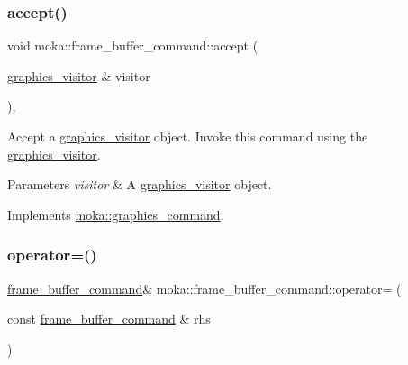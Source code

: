 \subsubsection{\texorpdfstring{accept()}{accept()}}
{\footnotesize\ttfamily void moka\+::frame\+\_\+buffer\+\_\+command\+::accept (\begin{DoxyParamCaption}\item[{\mbox{\hyperlink{classmoka_1_1graphics__visitor}{graphics\+\_\+visitor}} \&}]{visitor }\end{DoxyParamCaption})\hspace{0.3cm}{\ttfamily [override]}, {\ttfamily [virtual]}}



Accept a \mbox{\hyperlink{classmoka_1_1graphics__visitor}{graphics\+\_\+visitor}} object. Invoke this command using the \mbox{\hyperlink{classmoka_1_1graphics__visitor}{graphics\+\_\+visitor}}. 


\begin{DoxyParams}{Parameters}
{\em visitor} & A \mbox{\hyperlink{classmoka_1_1graphics__visitor}{graphics\+\_\+visitor}} object. \\
\hline
\end{DoxyParams}


Implements \mbox{\hyperlink{classmoka_1_1graphics__command_a7affaeceb1019ab358c62185bce4e654}{moka\+::graphics\+\_\+command}}.

\mbox{\label{classmoka_1_1frame__buffer__command_a64f128f3ee73772fc196c68cd86346c6}} 
\subsubsection{\texorpdfstring{operator=()}{operator=()}\hspace{0.1cm}{\footnotesize\ttfamily [1/2]}}
{\footnotesize\ttfamily \mbox{\hyperlink{classmoka_1_1frame__buffer__command}{frame\+\_\+buffer\+\_\+command}}\& moka\+::frame\+\_\+buffer\+\_\+command\+::operator= (\begin{DoxyParamCaption}\item[{const \mbox{\hyperlink{classmoka_1_1frame__buffer__command}{frame\+\_\+buffer\+\_\+command}} \&}]{rhs }\end{DoxyParamCaption})}

\mbox{\label{classmoka_1_1frame__buffer__command_a5d3890ff059f2859471d9d6d6b346ba6}} 
